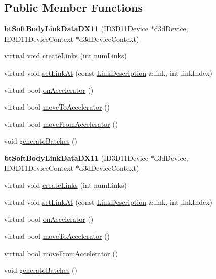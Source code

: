 \subsection*{Public Member Functions}
\begin{DoxyCompactItemize}
\item 
\mbox{\label{classbtSoftBodyLinkDataDX11_af003a11ce013c75e13426b326fcedc92}} 
{\bfseries bt\+Soft\+Body\+Link\+Data\+D\+X11} (I\+D3\+D11\+Device $\ast$d3d\+Device, I\+D3\+D11\+Device\+Context $\ast$d3d\+Device\+Context)
\item 
virtual void \hyperlink{classbtSoftBodyLinkDataDX11_a5844647a05674cc45bf99b658ba1804a}{create\+Links} (int num\+Links)
\item 
virtual void \hyperlink{classbtSoftBodyLinkDataDX11_a4ceea7a93543a6a54719e1d77c21cae1}{set\+Link\+At} (const \hyperlink{classbtSoftBodyLinkData_1_1LinkDescription}{Link\+Description} \&link, int link\+Index)
\item 
virtual bool \hyperlink{classbtSoftBodyLinkDataDX11_a3138e6cb78bf8dac4786a3c45b26d5b8}{on\+Accelerator} ()
\item 
virtual bool \hyperlink{classbtSoftBodyLinkDataDX11_a6b08733c3c0216869e893779fb55d4c0}{move\+To\+Accelerator} ()
\item 
virtual bool \hyperlink{classbtSoftBodyLinkDataDX11_aad757252b4538a6f8f6eca526335e71d}{move\+From\+Accelerator} ()
\item 
void \hyperlink{classbtSoftBodyLinkDataDX11_ad19a5a48d1e5c611b5bbff496e8e591c}{generate\+Batches} ()
\item 
\mbox{\label{classbtSoftBodyLinkDataDX11_af003a11ce013c75e13426b326fcedc92}} 
{\bfseries bt\+Soft\+Body\+Link\+Data\+D\+X11} (I\+D3\+D11\+Device $\ast$d3d\+Device, I\+D3\+D11\+Device\+Context $\ast$d3d\+Device\+Context)
\item 
virtual void \hyperlink{classbtSoftBodyLinkDataDX11_afe887ef6ecba2a73287f1b3260a0f3e4}{create\+Links} (int num\+Links)
\item 
virtual void \hyperlink{classbtSoftBodyLinkDataDX11_a33aa1666f79ec3e6b065844a02930faf}{set\+Link\+At} (const \hyperlink{classbtSoftBodyLinkData_1_1LinkDescription}{Link\+Description} \&link, int link\+Index)
\item 
virtual bool \hyperlink{classbtSoftBodyLinkDataDX11_a97835c62006c461555d41c61af626f17}{on\+Accelerator} ()
\item 
virtual bool \hyperlink{classbtSoftBodyLinkDataDX11_a3f94047cb03b1604946c20ae944946a0}{move\+To\+Accelerator} ()
\item 
virtual bool \hyperlink{classbtSoftBodyLinkDataDX11_a503f2df316127641cde3ab997b511735}{move\+From\+Accelerator} ()
\item 
void \hyperlink{classbtSoftBodyLinkDataDX11_ad19a5a48d1e5c611b5bbff496e8e591c}{generate\+Batches} ()
\end{DoxyCompactItemize}

